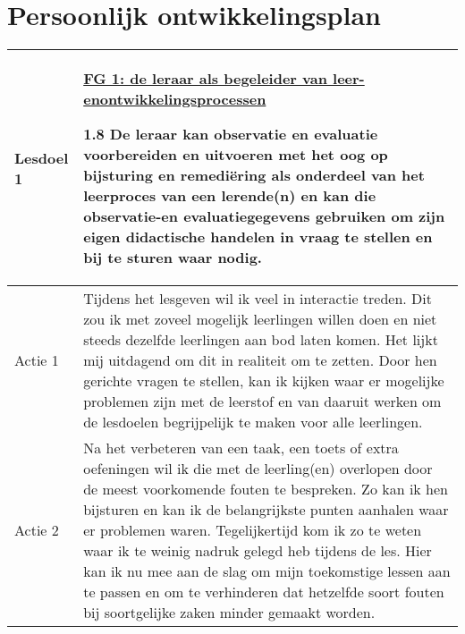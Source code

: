 
\section{Persoonlijk ontwikkelingsplan}
\begin{tabularx}{\textwidth}{|p{}|p{}|}
	\hline
	\textbf{Lesdoel 1} & 
	\underline{FG 1: de leraar als begeleider van leer- en}\newline \underline{ontwikkelingsprocessen}\newline
	
	1.8 De leraar kan observatie en evaluatie voorbereiden en uitvoeren met het oog op bijsturing en remediëring als onderdeel van het leerproces van een lerende(n) en kan die observatie-en evaluatiegegevens gebruiken om zijn eigen didactische handelen in vraag te stellen en bij te sturen waar nodig.\\ \hline
	Actie 1 & Tijdens het lesgeven wil ik veel in interactie treden. Dit zou ik met zoveel mogelijk leerlingen willen doen en niet steeds dezelfde leerlingen aan bod laten komen. Het lijkt mij uitdagend om dit in realiteit om te zetten. Door hen gerichte vragen te stellen, kan ik kijken waar er mogelijke problemen zijn met de leerstof en van daaruit werken om de lesdoelen begrijpelijk te maken voor alle leerlingen. \\ \hline
	Actie 2 & Na het verbeteren van een taak, een toets of extra oefeningen wil ik die met de leerling(en) overlopen door de meest voorkomende fouten te bespreken. Zo kan ik hen bijsturen en kan ik de belangrijkste punten aanhalen waar er problemen waren. Tegelijkertijd kom ik zo te weten waar ik te weinig nadruk gelegd heb tijdens de les. Hier kan ik nu mee aan de slag om mijn toekomstige lessen aan te passen en om te verhinderen dat hetzelfde soort fouten bij soortgelijke zaken minder gemaakt worden. \\ \hline
\end{tabularx}


